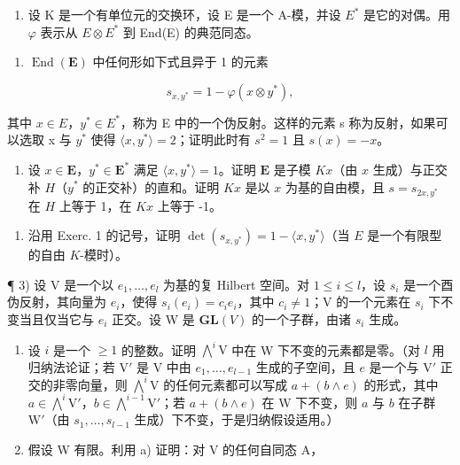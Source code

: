 
\begin{enumerate}
\def\labelenumi{\arabic{enumi})}
\tightlist
\item
  设 K 是一个有单位元的交换环，设 E 是一个 A-模，并设 \(E^{*}\) 是它的对偶。用 \(\varphi\) 表示从 \(E \otimes E^{*}\) 到 End(E) 的典范同态。
\end{enumerate}

\begin{enumerate}
\def\labelenumi{\alph{enumi})}
\tightlist
\item
  \(\operatorname{End}(\mathbf{E})\) 中任何形如下式且异于 1 的元素
\end{enumerate}

\[
s _ {x, y ^ {*}} = 1 - \varphi (x \otimes y ^ {*}),
\]

其中 \(x \in E\)，\(y^{*} \in E^{*}\)，称为 E 中的一个伪反射。这样的元素 s 称为反射，如果可以选取 x 与 \(y^{*}\) 使得 \(\langle x, y^{*} \rangle = 2\)；证明此时有 \(s^{2} = 1\) 且 \(s(x) = -x\)。

\begin{enumerate}
\def\labelenumi{\alph{enumi})}
\setcounter{enumi}{1}
\tightlist
\item
  设 \(x \in \mathbf{E}\)，\(y^{*} \in \mathbf{E}^{*}\) 满足 \(\langle x, y^{*} \rangle = 1\)。证明 \(\mathbf{E}\) 是子模 \(Kx\)（由 \(x\) 生成）与正交补 \(H\)（\(y^{*}\) 的正交补）的直和。证明 \(Kx\) 是以 \(x\) 为基的自由模，且 \(s = s_{2x,y^*}\) 在 \(H\) 上等于 1，在 \(Kx\) 上等于 -1。
\end{enumerate}

\begin{enumerate}
\def\labelenumi{\arabic{enumi})}
\setcounter{enumi}{1}
\tightlist
\item
  沿用 Exerc. 1 的记号，证明 \(\det(s_{x,y^*}) = 1 - \langle x, y^* \rangle\)（当 \(E\) 是一个有限型的自由 \(K\)-模时）。
\end{enumerate}

¶ 3) 设 V 是一个以 \(e_1, \ldots, e_l\) 为基的复 Hilbert 空间。对 \(1 \leqslant i \leqslant l\)，设 \(s_i\) 是一个酉伪反射，其向量为 \(e_i\)，使得 \(s_i(e_i) = c_i e_i\)，其中 \(c_i \neq 1\)；V 的一个元素在 \(s_i\) 下不变当且仅当它与 \(e_i\) 正交。设 W 是 \(\mathbf{GL}(V)\) 的一个子群，由诸 \(s_i\) 生成。

\begin{enumerate}
\def\labelenumi{\alph{enumi})}
\item
  设 \(i\) 是一个 \(\geqslant 1\) 的整数。证明 \(\bigwedge^{i}\mathrm{V}\) 中在 W 下不变的元素都是零。（对 \(l\) 用归纳法论证；若 \(\mathrm{V}'\) 是 V 中由 \(e_1, \ldots, e_{l-1}\) 生成的子空间，且 \(e\) 是一个与 \(\mathrm{V}'\) 正交的非零向量，则 \(\bigwedge^{i}\mathrm{V}\) 的任何元素都可以写成 \(a + (b \wedge e)\) 的形式，其中 \(a \in \bigwedge^{i}\mathrm{V}'\)，\(b \in \bigwedge^{i-1}\mathrm{V}'\)；若 \(a + (b \wedge e)\) 在 W 下不变，则 \(a\) 与 \(b\) 在子群 \(\mathrm{W}'\)（由 \(s_1, \ldots, s_{l-1}\) 生成）下不变，于是归纳假设适用。）
\item
  假设 W 有限。利用 a) 证明：对 V 的任何自同态 A，
\end{enumerate}

